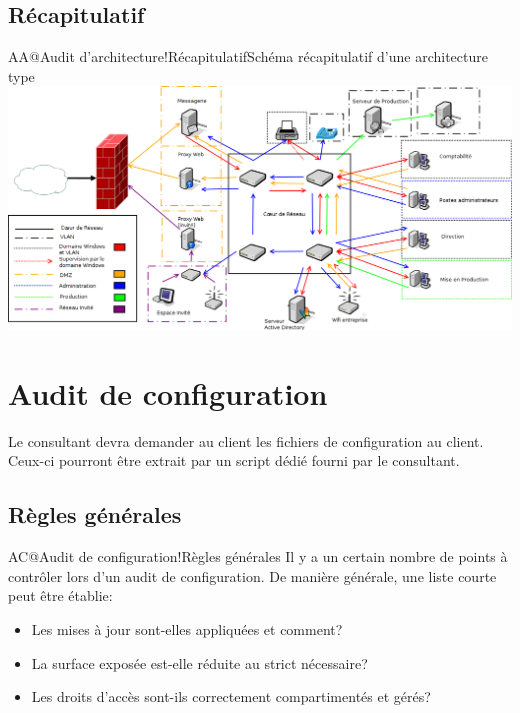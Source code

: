 \documentclass[twoside,a4paper,12pt,titlepage]{book}
\begin{document}
\begin{landscape}
\section{Récapitulatif}
\begin{Recap_2}{AA@Audit d'architecture!Récapitulatif}{Schéma récapitulatif d'une architecture type}{}
		\includegraphics[width=\textwidth]{AuditArchiRecap.png}
	\end{Recap_2}
\end{landscape}

\chapter{Audit de configuration}\label{AuditConf}
\begin{Pre}Le consultant devra demander au client les fichiers de configuration au client. Ceux-ci pourront être extrait par un script dédié fourni par le consultant.\end{Pre}
\section{Règles générales}
\begin{Define}{AC@Audit de configuration!Règles générales}
Il y a un certain nombre de points à contrôler lors d'un audit de configuration. De manière générale, une liste courte peut être établie:\begin{itemize}
	\item Les mises à jour sont-elles appliquées et comment?
	\item La surface exposée est-elle réduite au strict nécessaire?
	\item Les droits d'accès sont-ils correctement compartimentés et gérés?
\end{itemize}
\end{Define}
\end{document}
